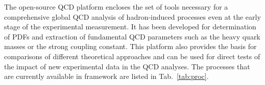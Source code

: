 %
The open-source QCD platform \fitter encloses the set of tools  necessary for a comprehensive global 
QCD analysis of hadron-induced processes even at the early stage of the experimental measurement. 
It has been developed for determination of PDFs and extraction of fundamental QCD parameters such as the heavy
quark masses or the strong coupling constant. This platform also provides the basis for 
comparisons of different theoretical approaches and can be used for direct tests of the impact 
of new experimental data in the QCD analyses.
%
The processes that are currently available in \fitter framework are listed in Tab.~\ref{tab:proc}.
%
\begin{table}
\small
\scriptsize


\end{table}
